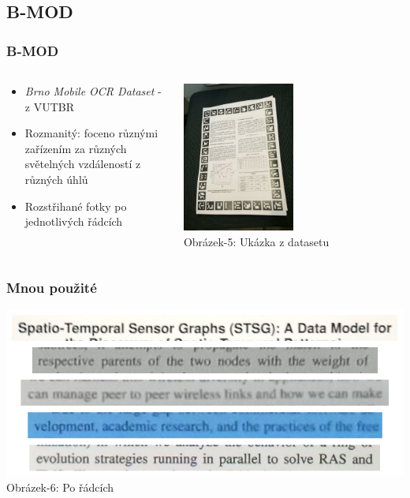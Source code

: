 \documentclass{beamer}
\begin{document}
\subsection{B-MOD}
\begin{frame}
\frametitle{B-MOD}
		\begin{columns}
		\begin{column}{0.5\textwidth}
\begin{itemize}
\item \emph{Brno Mobile OCR Dataset} - z VUTBR
\item Rozmanitý: foceno různými zařízením za různých světelných vzdáleností z různých úhlů
\item Rozstřihané fotky po jednotlivých řádcích
\end{itemize}
		\end{column}
		\begin{column}{0.5\textwidth}
    	\begin{center}
     	\includegraphics[width=0.5\textwidth]{img/bmod-sample.jpg}\\
     	Obrázek-5: Ukázka z datasetu
     	\end{center}
		\end{column}
		\end{columns}
\end{frame}
\begin{frame}
\frametitle{Mnou použité}
    	\begin{center}
     	\includegraphics[width=1\textwidth]{img/bmod-easy.png}\\
     	Obrázek-6: Po řádcích
     	\end{center}
\end{frame}
\end{document}
